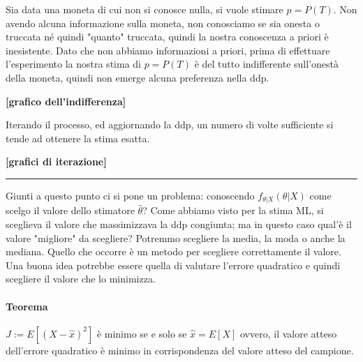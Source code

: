 \begin{esempio}
Sia data una moneta di cui non si conosce nulla, si vuole stimare $p=P(T)$.\newline
Non avendo alcuna informazione sulla moneta, non conosciamo se sia onesta o truccata né quindi "quanto" truccata, quindi la nostra conoscenza a priori è inesistente.\newline
Dato che non abbiamo informazioni a priori, prima di effettuare l'esperimento la nostra stima di $p=P(T)$ è del tutto indifferente sull'onestà della moneta, quindi non emerge alcuna preferenza nella ddp.

\begin{center}\textbf{[grafico dell'indifferenza]}\end{center}

Iterando il processo, ed aggiornando la ddp, un numero di volte sufficiente si tende ad ottenere la stima esatta.

\textbf{[grafici di iterazione]}
\end{esempio}
\begin{center} \rule{300pt}{1pt} \end{center}

Giunti a questo punto ci si pone un problema: conoscendo $f_{\theta|X}(\theta|X)$ come scelgo il valore dello stimatore $\hat{\theta}$? Come abbiamo visto per la stima ML, si sceglieva il valore che massimizzava la ddp congiunta; ma in questo caso qual'è il valore "migliore" da scegliere? Potremmo scegliere la media, la moda o anche la mediana. Quello che occorre è un metodo per scegliere correttamente il valore.\newline
Una buona idea potrebbe essere quella di valutare l'errore quadratico e quindi scegliere il valore che lo minimizza.
\paragraph{Teorema} $J:=E[(X-\hat{x})^2]$ è minimo se e solo se $\hat{x}=E[X]$
ovvero, il valore atteso dell'errore quadratico è minimo in corrispondenza del valore atteso del campione.

